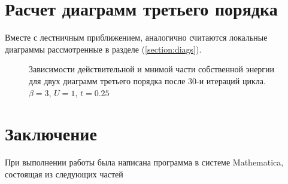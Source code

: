 \documentclass[11pt,a4paper]{report}
\begin{document}
\section{Расчет диаграмм третьего порядка}

Вместе с лестничным приближением, аналогично считаются локальные диаграммы рассмотренные в разделе (\ref{section:diags}).

\begin{figure}[H]
\centering
{}

\caption{Зависимости действительной и мнимой части собственной энергии для двух диаграмм третьего порядка после 30-и итераций цикла. $\beta=3$, $U=1$, $t=0.25$}
\label{Sigma}
\end{figure}

\section{Заключение}

При выполнении работы была написана программа в системе Mathematica, состоящая из следующих частей
\end{document}
